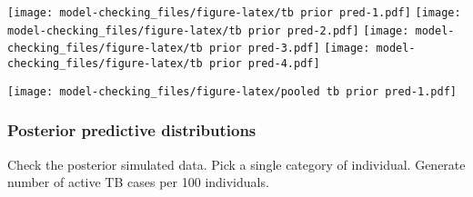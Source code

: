 \documentclass[]{article}
\newenvironment{Shaded}{\begin{snugshade}}{\end{snugshade}}
\newcommand{\DataTypeTok}[1]{\textcolor[rgb]{0.13,0.29,0.53}{#1}}
\newcommand{\DecValTok}[1]{\textcolor[rgb]{0.00,0.00,0.81}{#1}}
\newcommand{\FloatTok}[1]{\textcolor[rgb]{0.00,0.00,0.81}{#1}}
\newcommand{\KeywordTok}[1]{\textcolor[rgb]{0.13,0.29,0.53}{\textbf{#1}}}
\newcommand{\NormalTok}[1]{#1}
\newcommand{\OperatorTok}[1]{\textcolor[rgb]{0.81,0.36,0.00}{\textbf{#1}}}
\newcommand{\OtherTok}[1]{\textcolor[rgb]{0.56,0.35,0.01}{#1}}
\newcommand{\StringTok}[1]{\textcolor[rgb]{0.31,0.60,0.02}{#1}}
\begin{document}
\texttt{[image: model-checking\_files/figure-latex/tb prior pred-1.pdf]}
\texttt{[image: model-checking\_files/figure-latex/tb prior pred-2.pdf]}
\texttt{[image: model-checking\_files/figure-latex/tb prior pred-3.pdf]}
\texttt{[image: model-checking\_files/figure-latex/tb prior pred-4.pdf]}

\begin{Shaded}
\end{Shaded}

\texttt{[image: model-checking\_files/figure-latex/pooled tb prior pred-1.pdf]}

\hypertarget{posterior-predictive-distributions}{%
\subsubsection{Posterior predictive
distributions}\label{posterior-predictive-distributions}}

Check the posterior simulated data. Pick a single category of
individual. Generate number of active TB cases per 100 individuals.

\begin{Shaded}
\end{Shaded}
\end{document}
